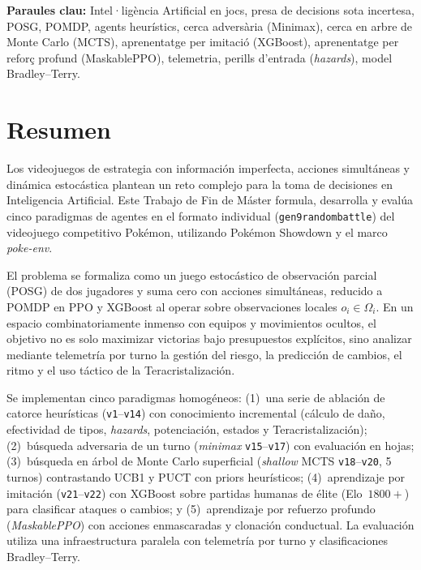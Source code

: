 \vspace{0.3cm}
\noindent\textbf{Paraules clau:} Intel·ligència Artificial en jocs, presa de decisions sota incertesa, POSG, POMDP, agents heurístics, cerca adversària (Minimax), cerca en arbre de Monte Carlo (MCTS), aprenentatge per imitació (XGBoost), aprenentatge per reforç profund (MaskablePPO), telemetria, perills d'entrada (\emph{hazards}), model Bradley--Terry.

\clearpage

\chapter*{Resumen}
Los videojuegos de estrategia con información imperfecta, acciones simultáneas y dinámica estocástica plantean un reto complejo para la toma de decisiones en Inteligencia Artificial. Este Trabajo de Fin de Máster formula, desarrolla y evalúa cinco paradigmas de agentes en el formato individual (\texttt{gen9randombattle}) del videojuego competitivo Pokémon, utilizando Pokémon Showdown y el marco \textit{poke-env}.

El problema se formaliza como un juego estocástico de observación parcial (POSG) de dos jugadores y suma cero con acciones simultáneas, reducido a POMDP en PPO y XGBoost al operar sobre observaciones locales $o_i \in \Omega_i$. En un espacio combinatoriamente inmenso con equipos y movimientos ocultos, el objetivo no es solo maximizar victorias bajo presupuestos explícitos, sino analizar mediante telemetría por turno la gestión del riesgo, la predicción de cambios, el ritmo y el uso táctico de la Teracristalización.

Se implementan cinco paradigmas homogéneos: (1)~una serie de ablación de catorce heurísticas (\texttt{v1}--\texttt{v14}) con conocimiento incremental (cálculo de daño, efectividad de tipos, \emph{hazards}, potenciación, estados y Teracristalización); (2)~búsqueda adversaria de un turno (\emph{minimax} \texttt{v15}--\texttt{v17}) con evaluación en hojas; (3)~búsqueda en árbol de Monte Carlo superficial (\emph{shallow} MCTS \texttt{v18}--\texttt{v20}, 5 turnos) contrastando UCB1 y PUCT con priors heurísticos; (4)~aprendizaje por imitación (\texttt{v21}--\texttt{v22}) con XGBoost sobre partidas humanas de élite (Elo~$1800+$) para clasificar ataques o cambios; y (5)~aprendizaje por refuerzo profundo (\emph{MaskablePPO}) con acciones enmascaradas y clonación conductual. La evaluación utiliza una infraestructura paralela con telemetría por turno y clasificaciones Bradley--Terry.

